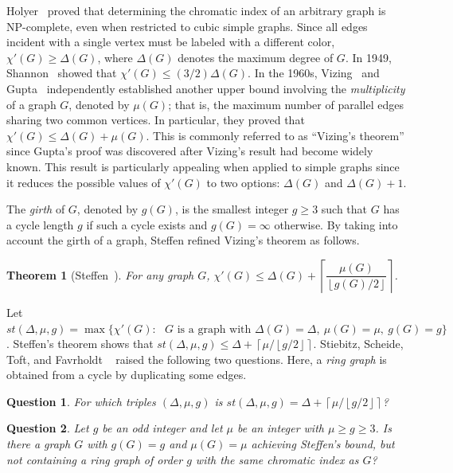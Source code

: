 \documentclass[12pt,oneside]{amsart}
\newtheorem{theorem}{Theorem}[section]
\newtheorem{question}{Question}[section]
\newcommand\roundup[1]{\left\lceil#1\right\rceil}
\newcommand\rounddown[1]{\left\lfloor#1\right\rfloor}
\begin{document}
Holyer~\cite{MR635430} proved that
determining the chromatic index of an arbitrary graph is NP-complete, even when restricted to cubic simple graphs.
Since all edges incident with a single vertex must be labeled with a different color, $\chi'(G)\geq\Delta(G)$, where $\Delta(G)$ denotes the maximum degree of $G$. In 1949,
Shannon~\cite{MR30203}  showed that $\chi'(G)\leq (3/2)\Delta(G)$. In the 1960s, Vizing~\cite{MR240000} and Gupta~\cite{Gupta} independently established another upper bound involving the {\it multiplicity} of a graph $G$, denoted by $\mu(G)$; that is, the maximum number of parallel edges sharing two common vertices. In particular, they proved that $\chi'(G)\leq \Delta(G) + \mu(G)$. This is commonly referred to as ``Vizing's theorem'' since Gupta's proof was discovered after Vizing's result had become widely known. This result is particularly appealing when applied to  simple graphs since it reduces the possible values of $\chi'(G)$ to two options: $\Delta(G)$ and $\Delta(G)+1$.

The {\it girth} of $G$, denoted by $g(G)$,  is the smallest integer $g \ge 3$ such that $G$ has a cycle length $g$ if such a cycle exists and $g(G) = \infty$ otherwise. By taking into account the girth of a graph, Steffen refined Vizing's theorem as follows.
\begin{theorem}[Steffen~\cite{MR1754344}]\label{Thm-Steffen}
For any graph $G$,
    $ \label{eqn:Steffen}
        \chi'(G)\leq \Delta(G)+\roundup{\dfrac{\mu(G)}{\rounddown{g(G)/2}}}$.

\end{theorem}






Let $st(\Delta, \mu, g) =\max\{\chi'(G) :  \mbox{  $G$ is a graph with } \Delta(G) = \Delta,\  \mu(G) = \mu,\  g(G) = g\}$.
Steffen's theorem shows that $st(\Delta, \mu, g) \le \Delta +\roundup{\mu/\rounddown{g/2}}$.
Stiebitz, Scheide, Toft, and Favrholdt ~\cite[ch. 9, pp. 249-250]{MR2975974}  raised the following two questions. Here, a {\it ring graph} is obtained from a cycle by duplicating some edges.



\begin{question}
\label{GuptaConj1}
    For which triples $(\Delta,\mu,g)$ is   $st(\Delta, \mu, g)  = \Delta+\roundup{\mu/\rounddown{g/2}}$?
\end{question}
\begin{question}
\label{GuptaConj2}
    Let $g$ be an odd integer and let $\mu$ be an integer with $\mu\geq g\geq 3$. Is there a graph $G$ with $g(G)=g$ and $\mu(G)=\mu$ achieving Steffen's bound, but not containing a ring graph of order $g$ with the same chromatic index as $G$?
\end{question}
\end{document}
